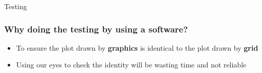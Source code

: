 \documentclass{beamer}
\begin{document}












\begin{frame}
\begin{center}
\Huge Testing
\end{center}
\end{frame}

\begin{frame}
\frametitle{Why doing the testing by using a software?}

\begin{itemize}
  \item To ensure the plot drawn by \textbf{graphics} is identical to the plot drawn by \textbf{grid}
  \item Using our eyes to check the identity will be wasting time and not reliable
  
\end{itemize}

\end{frame}
\end{document}
